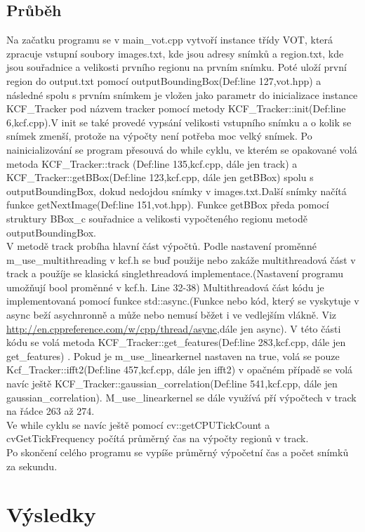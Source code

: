 \documentclass{article}
\begin{document}
\subsection{Průběh}
Na začatku programu se v main\_vot.cpp vytvoří instance třídy VOT, která zpracuje vstupní soubory images.txt, kde jsou adresy snímků a region.txt, kde jsou souřadnice a velikosti prvního regionu na prvním snímku. Poté uloží první region do output.txt pomocí outputBoundingBox(Def:line 127,vot.hpp) a následné spolu s prvním snímkem je vložen jako parametr do inicializace instance KCF\_Tracker pod názvem tracker pomocí metody KCF\_Tracker::init(Def:line 6,kcf.cpp).V init se také provedé vypsání velikosti vstupního snímku a o kolik se snímek zmenší, protože na výpočty není potřeba moc velký snímek. Po nainicializování se program přesouvá do while cyklu, ve kterém se opakované volá metoda KCF\_Tracker::track (Def:line 135,kcf.cpp, dále jen track) a KCF\_Tracker::getBBox(Def:line 123,kcf.cpp, dále jen getBBox) spolu s outputBoundingBox, dokud nedojdou snímky v images.txt.Další snímky načítá funkce getNextImage(Def:line 151,vot.hpp). Funkce getBBox předa pomocí struktury BBox\_c souřadnice a velikosti vypočteného regionu metodě outputBoundingBox.\\
V metodě track probíha hlavní část výpočtů. Podle nastavení proměnné\\ m\_use\_multithreading v kcf.h se buď použije nebo zakáže multithreadová část v track a použíje se klasická singlethreadová implementace.(Nastavení programu umožňují bool proměnné v kcf.h. Line 32-38) Multithreadová část kódu je implementovaná pomocí funkce std::async.\label{async}(Funkce nebo kód, který se vyskytuje v async beží asychnronně a může nebo nemusí běžet i ve vedlejším vlákně. Viz \url{http://en.cppreference.com/w/cpp/thread/async},dále jen async). V této části kódu se volá metoda KCF\_Tracker::get\_features(Def:line 283,kcf.cpp, dále jen get\_features) . Pokud je m\_use\_linearkernel nastaven na true, volá se pouze Kcf\_Tracker::ifft2(Def:line 457,kcf.cpp, dále jen ifft2) v opačném případě se volá navíc ještě KCF\_Tracker::gaussian\_correlation(Def:line 541,kcf.cpp, dále jen gaussian\_correlation). M\_use\_linearkernel se dále využívá pří výpočtech v track na řádce 263 až 274.\\
Ve while cyklu se navíc ještě pomocí cv::getCPUTickCount a cvGetTickFrequency počítá průměrný čas na výpočty regionů v track.\\
Po skončení celého programu se vypíše průměrný výpočetní čas a počet snímků za sekundu.
\section{Výsledky}
\end{document}

